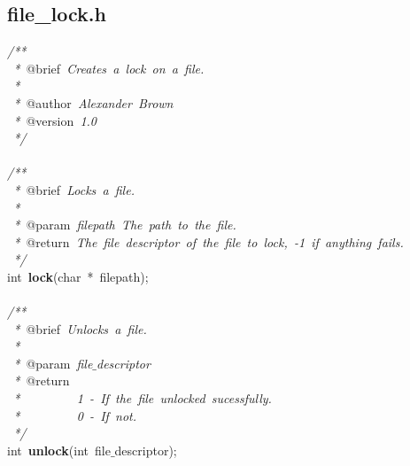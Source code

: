\subsection{file\_lock.h}
\scriptsize
\sffamily
\noindent
\mbox{}\textit{/**} \\
\mbox{}\textit{\ *\ }@brief\textit{\ Creates\ a\ lock\ on\ a\ file.} \\
\mbox{}\textit{\ *} \\
\mbox{}\textit{\ *\ }@author\textit{\ Alexander\ Brown} \\
\mbox{}\textit{\ *\ }@version\textit{\ 1.0} \\
\mbox{}\textit{\ */} \\
\mbox{} \\
\mbox{}\textit{/**} \\
\mbox{}\textit{\ *\ }@brief\textit{\ Locks\ a\ file.} \\
\mbox{}\textit{\ *} \\
\mbox{}\textit{\ *\ }@param\textit{\ filepath\ The\ path\ to\ the\ file.} \\
\mbox{}\textit{\ *\ }@return\textit{\ The\ file\ descriptor\ of\ the\ file\ to\ lock,\ -1\ if\ anything\ fails.} \\
\mbox{}\textit{\ */} \\
\mbox{}int\ \textbf{lock}(char\ *\ filepath); \\
\mbox{} \\
\mbox{}\textit{/**} \\
\mbox{}\textit{\ *\ }@brief\textit{\ Unlocks\ a\ file.} \\
\mbox{}\textit{\ *} \\
\mbox{}\textit{\ *\ }@param\textit{\ file$\_$descriptor} \\
\mbox{}\textit{\ *\ }@return \\
\mbox{}\textit{\ *\ \ \ \ \ \ \ \ \ 1\ -\ If\ the\ file\ unlocked\ sucessfully.} \\
\mbox{}\textit{\ *\ \ \ \ \ \ \ \ \ 0\ -\ If\ not.} \\
\mbox{}\textit{\ */} \\
\mbox{}int\ \textbf{unlock}(int\ file$\_$descriptor); \\

\clearpage
\normalsize
\rmfamily
